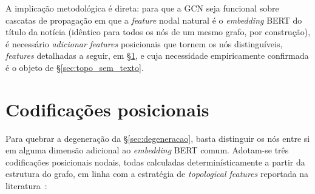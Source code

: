 A implica\c{c}\~ao metodol\'ogica \'e direta: para que a GCN seja
funcional sobre cascatas de propaga\c{c}\~ao em que a \emph{feature}
nodal natural \'e o \emph{embedding} BERT do t\'itulo da not\'icia
(id\^entico para todos os n\'os de um mesmo grafo, por
constru\c{c}\~ao), \'e necess\'ario \emph{adicionar} \emph{features}
posicionais que tornem os n\'os distingu\'iveis, \emph{features}
detalhadas a seguir, em \S\ref{sec:encodings}, e cuja necessidade
empiricamente confirmada \'e o objeto de \S\ref{sec:topo_sem_texto}.

\section{Codifica\c{c}\~oes posicionais}
\label{sec:encodings}

Para quebrar a degenera\c{c}\~ao da \S\ref{sec:degeneracao}, basta
distinguir os n\'os entre si em alguma dimens\~ao adicional ao
\emph{embedding} BERT comum. Adotam-se tr\^es codifica\c{c}\~oes
posicionais nodais, todas calculadas determin\'isticamente a partir da
estrutura do grafo, em linha com a estrat\'egia de \emph{topological
features} reportada na literatura~\cite{arxiv_topologicalfeatures}:

